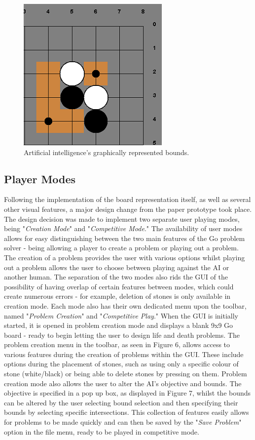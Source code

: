 \documentclass{l3proj}
\begin{document}
\begin{figure}[H]
\centering
\includegraphics[scale=1]{Images/GUI-5-Bounds.png}
\caption{Artificial intelligence's graphically represented bounds.}
\end{figure}

\subsection{Player Modes}

Following the implementation of the board representation itself, as well as several other visual features, a major design change from the paper prototype took place. The design decision was made to implement two separate user playing modes, being "\textit{Creation Mode}" and "\textit{Competitive Mode}." The availability of user modes allows for easy distinguishing between the two main features of the Go problem solver - being allowing a player to create a problem or playing out a problem. The creation of a problem provides the user with various options whilst playing out a problem allows the user to choose between playing against the AI or another human. The separation of the two modes also rids the GUI of the possibility of having overlap of certain features between modes, which could create numerous errors - for example, deletion of stones is only available in creation mode. Each mode also has their own dedicated menu upon the toolbar, named "\textit{Problem Creation}" and "\textit{Competitive Play}."
When the GUI is initially started, it is opened in problem creation mode and displays a blank 9x9 Go board - ready to begin letting the user to design life and death problems. The problem creation menu in the toolbar, as seen in Figure 6, allows access to various features during the creation of problems within the GUI. These include options during the placement of stones, such as using only a specific colour of stone (white/black) or being able to delete stones by pressing on them. Problem creation mode also allows the user to alter the AI's objective and bounds. The objective is specified in a pop up box, as displayed in Figure 7, whilst the bounds can be altered by the user selecting bound selection and then specifying their bounds by selecting specific intersections. This collection of features easily allows for problems to be made quickly and can then be saved by the "\textit{Save Problem}" option in the file menu, ready to be played in competitive mode.
\end{document}

